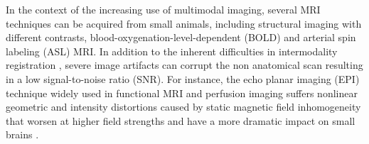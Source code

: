 \documentclass[utf8, a4paper, final, crop]{frontiersSCNS} %
\begin{document}
In the context of the increasing use of multimodal imaging, several %
MRI 
techniques 
can 
be acquired from small animals, including %
structural imaging with different contrasts, 
blood-oxygenation-level-dependent (BOLD) and  arterial spin labeling (ASL) MRI.
%
In addition to the inherent difficulties in intermodality registration \citep{ashburner1997multimodal},
severe image artifacts can corrupt the non anatomical scan
resulting in a low signal-to-noise ratio (SNR).
For instance, the echo 
planar imaging (EPI) %
technique widely used in %
functional MRI and perfusion imaging
suffers nonlinear geometric and intensity distortions caused by static magnetic field 
inhomogeneity that 
worsen at higher field strengths and have a more dramatic impact on small brains
\citep{hong2015evaluation}. 
\end{document}
